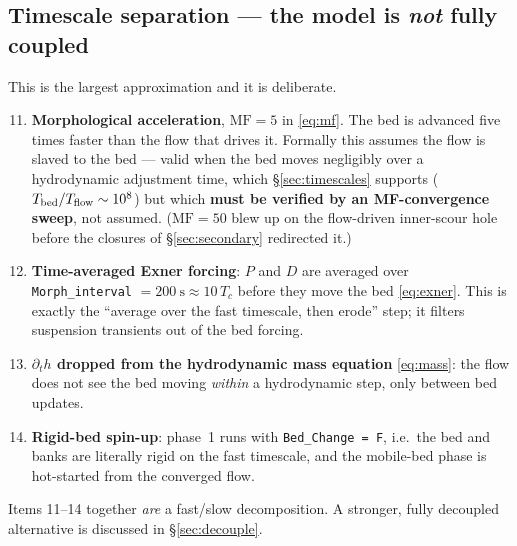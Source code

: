 \documentclass[11pt,a4paper]{article}
\newcommand{\dt}{\partial_t}
\newcommand{\code}[1]{\texttt{\small #1}}
\begin{document}
\subsection{Timescale separation --- the model is \emph{not} fully coupled}
\label{sec:approx-time}
This is the largest approximation and it is deliberate.
\begin{enumerate}\setcounter{enumi}{10}\itemsep1pt
  \item \textbf{Morphological acceleration}, $\mathrm{MF}=5$ in \eqref{eq:mf}. The bed
        is advanced five times faster than the flow that drives it. Formally this
        assumes the flow is slaved to the bed --- valid when the bed moves negligibly over
        a hydrodynamic adjustment time, which \S\ref{sec:timescales} supports
        ($T_{\rm bed}/T_{\rm flow}\sim10^8$) but which \textbf{must be verified by an
        MF-convergence sweep}, not assumed. ($\mathrm{MF}=50$ blew up on the flow-driven
        inner-scour hole before the closures of \S\ref{sec:secondary} redirected it.)
  \item \textbf{Time-averaged Exner forcing}: $P$ and $D$ are averaged over
        \code{Morph\_interval} $=200\ \mathrm s\approx10\,T_c$ before they move the bed
        \eqref{eq:exner}. This is exactly the ``average over the fast timescale, then
        erode'' step; it filters suspension transients out of the bed forcing.
  \item \textbf{$\dt h$ dropped from the hydrodynamic mass equation} \eqref{eq:mass}: the
        flow does not see the bed moving \emph{within} a hydrodynamic step, only between
        bed updates.
  \item \textbf{Rigid-bed spin-up}: phase~1 runs with \code{Bed\_Change = F}, i.e.\ the
        bed and banks are literally rigid on the fast timescale, and the mobile-bed phase
        is hot-started from the converged flow.
\end{enumerate}
Items 11--14 together \emph{are} a fast/slow decomposition. A stronger, fully decoupled
alternative is discussed in \S\ref{sec:decouple}.
\end{document}

